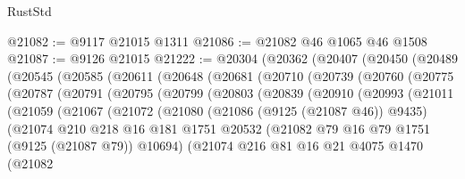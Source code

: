 \begin{lexlean}{RustStd}
\begin{coremodule}
@21082 := @9117 @21015 @1311
@21086 := @21082 @46 @1065 @46 @1508
@21087 := @9126 @21015
@21222 := @20304
    (@20362
      (@20407
        (@20450
          (@20489
            (@20545
              (@20585
                (@20611
                  (@20648
                    (@20681
                      (@20710
                        (@20739
                          (@20760
                            (@20775
                              (@20787
                                (@20791
                                  (@20795
                                    (@20799
                                      (@20803
                                        (@20839
                                          (@20910
                                            (@20993
                                              (@21011
                                                (@21059
                                                  (@21067
                                                    (@21072
                                                      (@21080
                                                        (@21086 (@9125 (@21087 @46)) @9435)
                                                        (@21074
                                                          @210
                                                          @218
                                                          @16
                                                          @181
                                                          @1751
                                                          @20532
                                                          (@21082
                                                            @79
                                                            @16
                                                            @79
                                                            @1751
                                                            (@9125 (@21087 @79))
                                                            @10694)
                                                          (@21074
                                                            @216
                                                            @81
                                                            @16
                                                            @21
                                                            @4075
                                                            @1470
                                                            (@21082

\end{coremodule}
\end{lexlean}
